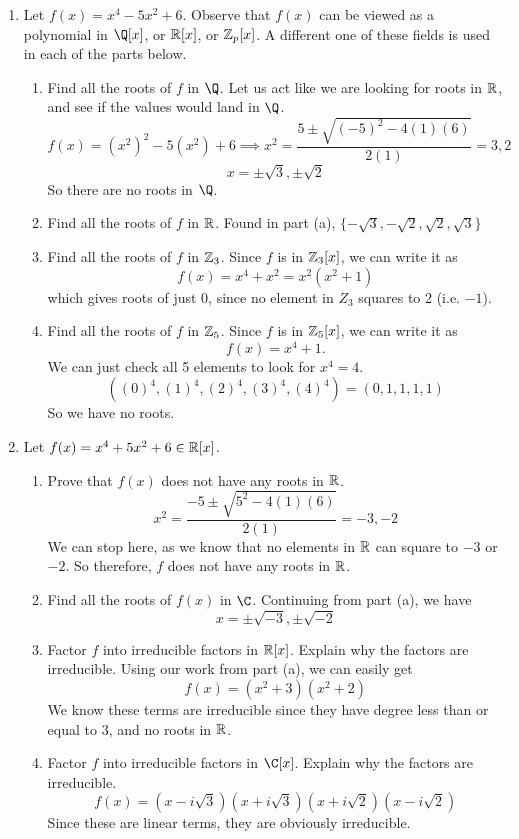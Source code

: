 \documentclass[12pt]{article}
\begin{document}
\begin{enumerate}
		\item Let $f(x) = x^4 - 5x^2 + 6$. Observe that $f(x)$ can be viewed as a polynomial in $\Q[x]$, or $\mathbb{R}[x]$, or $\mathbb{Z}_p[x]$. A different one of these fields is used in each of the parts below.
		\begin{enumerate}
			\item Find all the roots of $f$ in $\Q$.\m
			Let us act like we are looking for roots in $\mathbb{R}$, and see if the values would land in $\Q$.
			\[f(x) = (x^2)^2 -5(x^2)+6 \implies x^2 = \frac{5 \pm \sqrt{(-5)^2 -4(1)(6)}}{2(1)} = 3,2\]
			\[x = \pm \sqrt{3}, \pm \sqrt{2}\]
			So there are no roots in $\Q$.
			
			\item Find all the roots of $f$ in $\mathbb{R}$.\m
			Found in part (a), $\{-\sqrt{3},-\sqrt{2},\sqrt{2},\sqrt{3}\}$
			
			\item Find all the roots of $f$ in $\mathbb{Z}_3$.\m
			Since $f$ is in $\mathbb{Z}_3[x]$, we can write it as
			\[f(x) = x^4+x^2 = x^2(x^2+1)\]
			which gives roots of just $0$, since no element in $Z_3$ squares to $2$ (i.e. $-1$).
			
			\item Find all the roots of $f$ in $\mathbb{Z}_5$.\m
			Since $f$ is in $\mathbb{Z}_5[x]$, we can write it as
			\[f(x) = x^4+1.\]
			We can just check all 5 elements to look for $x^4 = 4$.
			\[((0)^4,(1)^4,(2)^4,(3)^4,(4)^4) = (0,1,1,1,1)\]
			So we have no roots.
			
		\end{enumerate}
	
		\item Let $f(x) = x^4 + 5x^2 + 6 \in \mathbb{R}[x]$.
		\begin{enumerate}
			\item Prove that $f(x)$ does not have any roots in $\mathbb{R}$.\m
			\[x^2 = \frac{-5 \pm \sqrt{5^2 -4(1)(6)}}{2(1)} = -3,-2\]
			We can stop here, as we know that no elements in $\mathbb{R}$ can square to $-3$ or $-2$. So therefore, $f$ does not have any roots in $\mathbb{R}$.
			
			\item Find all the roots of $f(x)$ in $\C$.\m
			Continuing from part (a), we have
			\[x = \pm \sqrt{-3},\pm \sqrt{-2}\]
			
			\item Factor $f$ into irreducible factors in $\mathbb{R}[x]$. Explain why the factors are irreducible.\m
			Using our work from part (a), we can easily get 
			\[f(x) = (x^2 + 3)(x^2 + 2)\]
			We know these terms are irreducible since they have degree less than or equal to 3, and no roots in $\mathbb{R}$.
			
			\item Factor $f$ into irreducible factors in $\C[x]$. Explain why the factors are irreducible.\m
			\[f(x) = (x-i\sqrt{3})(x+i\sqrt{3})(x+i\sqrt{2})(x-i\sqrt{2})\]
			Since these are linear terms, they are obviously irreducible.
		\end{enumerate}
		
	\end{enumerate}
\end{document}
